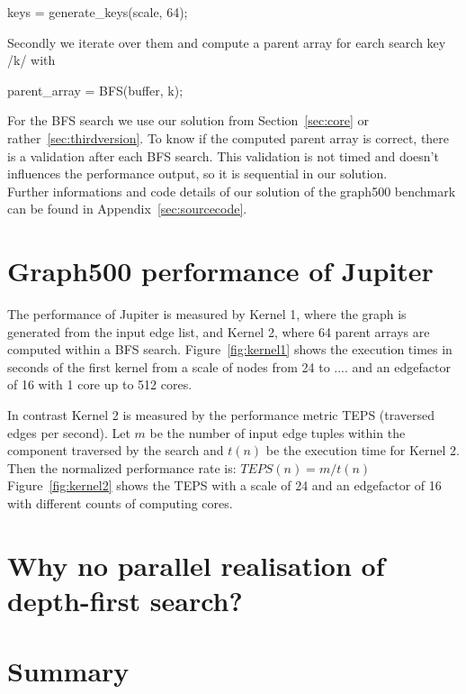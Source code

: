 \documentclass[12pt,a4paper]{article}
\begin{document}
\begin{ccode}
keys = generate_keys(scale, 64);
\end{ccode}
Secondly we iterate over them and compute a parent array for earch search key \cinline/k/ with
\begin{ccode}
parent_array = BFS(buffer, k);
\end{ccode}
For the BFS search we use our solution from Section~\ref{sec:core} or rather~\ref{sec:thirdversion}. To know if the computed parent array is correct, there is a validation after each BFS search. This validation is not timed and doesn't influences the performance output, so it is sequential in our solution.\\
Further informations and code details of our solution of the graph500 benchmark can be found in Appendix~\ref{sec:sourcecode}.

\section{Graph500 performance of Jupiter}
\label{sec:performance}

The performance of Jupiter is measured by Kernel 1, where the graph is generated from the input edge list, and Kernel 2, where 64 parent arrays are computed within a BFS search. Figure~\ref{fig:kernel1} shows the execution times in seconds of the first kernel from a scale of nodes from 24 to .... and an edgefactor of 16 with 1 core up to 512 cores.


In contrast Kernel 2 is measured by the performance metric TEPS (traversed edges per second).  Let \(m\) be the number of input edge tuples within the component traversed by the search and \(t(n)\) be the execution time for Kernel 2. Then the normalized performance rate is: \(TEPS(n) = m / t(n)\)\\
Figure~\ref{fig:kernel2} shows the TEPS with a scale of 24 and an edgefactor of 16 with different counts of computing cores.

\section{Why no parallel realisation of depth-first search?}
\label{sec:depth-first search}

\section{Summary}
\label{sec:summary}

\clearpage
\end{document}
